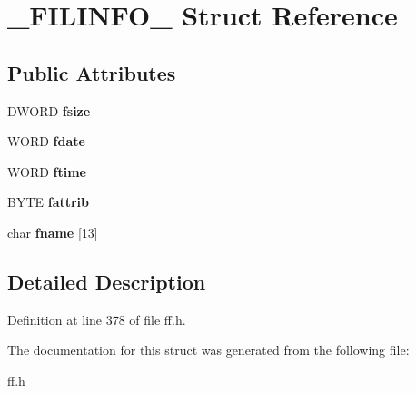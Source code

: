 \hypertarget{struct__FILINFO__}{\section{\-\_\-\-F\-I\-L\-I\-N\-F\-O\-\_\- Struct Reference}
\label{struct__FILINFO__}
}
\subsection*{Public Attributes}
\begin{DoxyCompactItemize}
\item 
\hypertarget{struct__FILINFO___a5161cc679ac486108d80a95b3e13af75}{D\-W\-O\-R\-D {\bfseries fsize}}\label{struct__FILINFO___a5161cc679ac486108d80a95b3e13af75}

\item 
\hypertarget{struct__FILINFO___ac580c77346a305bddc9d8e8752fc279f}{W\-O\-R\-D {\bfseries fdate}}\label{struct__FILINFO___ac580c77346a305bddc9d8e8752fc279f}

\item 
\hypertarget{struct__FILINFO___a053e65911c0480b000802ab3837579f5}{W\-O\-R\-D {\bfseries ftime}}\label{struct__FILINFO___a053e65911c0480b000802ab3837579f5}

\item 
\hypertarget{struct__FILINFO___a7ac197fbffa52bee952d98d3eeb20aa1}{B\-Y\-T\-E {\bfseries fattrib}}\label{struct__FILINFO___a7ac197fbffa52bee952d98d3eeb20aa1}

\item 
\hypertarget{struct__FILINFO___a83c87bfa39202f0da78d58c470f9e7e1}{char {\bfseries fname} \mbox{[}13\mbox{]}}\label{struct__FILINFO___a83c87bfa39202f0da78d58c470f9e7e1}

\end{DoxyCompactItemize}


\subsection{Detailed Description}


Definition at line 378 of file ff.\-h.



The documentation for this struct was generated from the following file\-:\begin{DoxyCompactItemize}
\item 
ff.\-h\end{DoxyCompactItemize}
